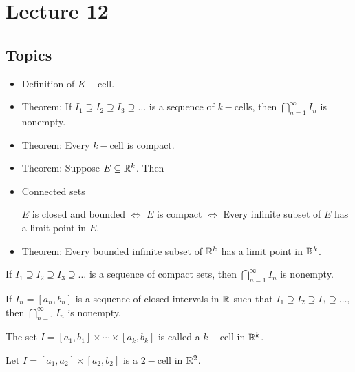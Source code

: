 \documentclass[a4paper]{report}
\begin{document}
\section{Lecture 12}

\subsection{Topics}

\begin{itemize}
    \item Definition of \( K- \)cell. 
    \item Theorem: If \( {I}_{1} \supseteq {I}_{2} \supseteq {I}_{3} \supseteq \dots  \) is a sequence of \( k- \)cells, then \( \bigcap_{ n = 1  }^{ \infty    }  {I}_{n} \) is nonempty.
    \item Theorem: Every \( k - \)cell is compact.
    \item Theorem: Suppose \( E \subseteq \mathbb{R}^{k} \). Then
    \item Connected sets
        \begin{center}
            \( E  \) is closed and bounded \( \iff  \) \( E  \) is compact \( \iff  \) Every infinite subset of \( E  \) has a limit point in \( E  \).
        \end{center}
    \item Theorem: Every bounded infinite subset of \( \mathbb{R}^{k} \) has a limit point in \( \mathbb{R}^{k } \). 
\end{itemize}

\begin{corollary}
If \( {I}_{1} \supseteq {I}_{2} \supseteq {I}_{3} \supseteq \dots  \) is a sequence of compact sets, then \( \bigcap_{ n = 1  }^{ \infty    }  {I}_{n} \) is nonempty.
\end{corollary}


\begin{theorem}
    If \( {I}_{n} = [{a}_{n}, {b}_{n}] \) is a sequence of closed intervals in \( \mathbb{R}  \) such that \( {I}_{1} \supseteq {I}_{2} \supseteq {I}_{3} \supseteq \dots  \), then \( \bigcap_{  n = 1 }^{ \infty   }  {I}_{n} \) is nonempty.
\end{theorem}

\begin{definition}[K-cell]
    The set \( I = [{a}_{1}, {b}_{1}] \times \cdots \times [{a}_{k}, {b}_{k}] \) is called a \( k- \)cell in \( \mathbb{R}^{k} \).  
\end{definition}
\begin{eg}
 Let \( I = [{a}_{1}, {a}_{2}]  \times [{a}_{2}, {b}_{2}] \) is a \( 2- \)cell in \( \mathbb{R}^{2} \).
\end{eg}
\end{document}
